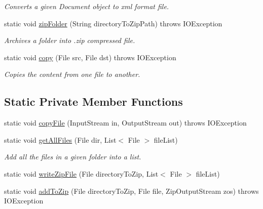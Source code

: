 \begin{DoxyCompactItemize}
\begin{DoxyCompactList}\small\item\em Converts a given Document object to xml format file. \end{DoxyCompactList}\item 
static void \hyperlink{classorg_1_1buildmlearn_1_1toolkit_1_1utilities_1_1FileUtils_aa79713cc1d17fbf9b7294c60e851b774}{zip\+Folder} (String directory\+To\+Zip\+Path)  throws I\+O\+Exception 
\begin{DoxyCompactList}\small\item\em Archives a folder into .zip compressed file. \end{DoxyCompactList}\item 
static void \hyperlink{classorg_1_1buildmlearn_1_1toolkit_1_1utilities_1_1FileUtils_a22131f5eeefec02f52908ab439ab528b}{copy} (File src, File dst)  throws I\+O\+Exception 
\begin{DoxyCompactList}\small\item\em Copies the content from one file to another. \end{DoxyCompactList}\end{DoxyCompactItemize}
\subsection*{Static Private Member Functions}
\begin{DoxyCompactItemize}
\item 
static void \hyperlink{classorg_1_1buildmlearn_1_1toolkit_1_1utilities_1_1FileUtils_aafa41feb34e473599f7181427de44c6c}{copy\+File} (Input\+Stream in, Output\+Stream out)  throws I\+O\+Exception 
\item 
static void \hyperlink{classorg_1_1buildmlearn_1_1toolkit_1_1utilities_1_1FileUtils_aa61e000a3890f6d8b42c1a537f8c2df4}{get\+All\+Files} (File dir, List$<$ File $>$ file\+List)
\begin{DoxyCompactList}\small\item\em Add all the files in a given folder into a list. \end{DoxyCompactList}\item 
static void \hyperlink{classorg_1_1buildmlearn_1_1toolkit_1_1utilities_1_1FileUtils_a65db51fe2a1892714317198a09958b7f}{write\+Zip\+File} (File directory\+To\+Zip, List$<$ File $>$ file\+List)
\item 
static void \hyperlink{classorg_1_1buildmlearn_1_1toolkit_1_1utilities_1_1FileUtils_aef6f60f80c3b591c89013a2acb2a9867}{add\+To\+Zip} (File directory\+To\+Zip, File file, Zip\+Output\+Stream zos)  throws I\+O\+Exception 
\end{DoxyCompactItemize}
